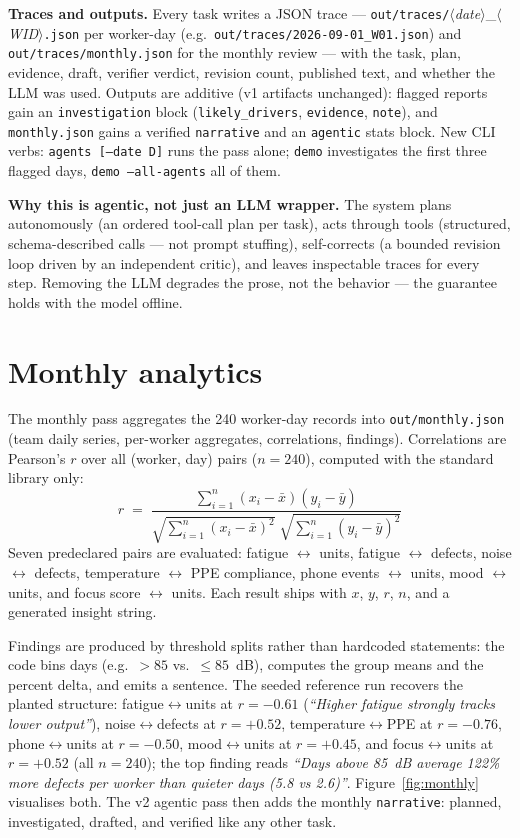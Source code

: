 \documentclass[11pt,a4paper]{article}
\begin{document}
\textbf{Traces and outputs.} Every task writes a JSON trace ---
\texttt{out/traces/}$\langle$\textit{date}$\rangle$\_$\langle$\textit{WID}$\rangle$\texttt{.json}
per worker-day (e.g.\ \texttt{out/traces/2026-09-01\_W01.json}) and
\texttt{out/traces/monthly.json} for the monthly review --- with the task,
plan, evidence, draft, verifier verdict, revision count, published text,
and whether the LLM was used. Outputs
are additive (v1 artifacts unchanged): flagged reports gain an
\texttt{investigation} block (\texttt{likely\_drivers}, \texttt{evidence},
\texttt{note}), and \texttt{monthly.json} gains a verified
\texttt{narrative} and an \texttt{agentic} stats block. New CLI verbs:
\texttt{agents [--date D]} runs the pass alone; \texttt{demo} investigates
the first three flagged days, \texttt{demo --all-agents} all of them.

\textbf{Why this is agentic, not just an LLM wrapper.} The system plans
autonomously (an ordered tool-call plan per task), acts through tools
(structured, schema-described calls --- not prompt stuffing), self-corrects
(a bounded revision loop driven by an independent critic), and leaves
inspectable traces for every step. Removing the LLM degrades the prose, not
the behavior --- the guarantee holds with the model offline.

\section{Monthly analytics}
The monthly pass aggregates the 240 worker-day records into
\texttt{out/monthly.json} (team daily series, per-worker aggregates,
correlations, findings). Correlations are
Pearson's $r$ over all (worker, day) pairs ($n = 240$), computed with the
standard library only:
\[
r \;=\; \frac{\sum_{i=1}^{n}(x_i-\bar{x})(y_i-\bar{y})}
{\sqrt{\sum_{i=1}^{n}(x_i-\bar{x})^2}\;\sqrt{\sum_{i=1}^{n}(y_i-\bar{y})^2}}
\]
Seven predeclared pairs are evaluated: fatigue $\leftrightarrow$ units,
fatigue $\leftrightarrow$ defects, noise $\leftrightarrow$ defects,
temperature $\leftrightarrow$ PPE compliance,
phone events $\leftrightarrow$ units, mood $\leftrightarrow$ units, and
focus score $\leftrightarrow$ units. Each result ships with $x$, $y$, $r$,
$n$, and a generated insight string.

Findings are produced by threshold splits rather than hardcoded
statements: the code bins days (e.g.\ $>85$ vs.\ $\le 85$~dB), computes the
group means and the percent delta, and emits a sentence. The seeded
reference run recovers the planted structure: fatigue$\leftrightarrow$units
at $r = -0.61$ (\emph{``Higher fatigue strongly tracks lower output''}),
noise$\leftrightarrow$defects at $r = +0.52$,
temperature$\leftrightarrow$PPE at $r = -0.76$,
phone$\leftrightarrow$units at $r = -0.50$, mood$\leftrightarrow$units at
$r = +0.45$, and focus$\leftrightarrow$units at $r = +0.52$ (all
$n = 240$); the top finding reads \emph{``Days above 85~dB average 122\%
more defects per worker than quieter days (5.8 vs 2.6)''}.
Figure~\ref{fig:monthly} visualises both. The v2 agentic
pass then adds the monthly \texttt{narrative}: planned, investigated,
drafted, and verified like any other task.
\end{document}
